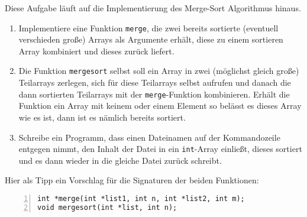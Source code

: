 \documentclass{uebungszettel}
\begin{document}
\begin{aufg}
Diese Aufgabe läuft auf die Implementierung des Merge-Sort Algorithmus hinaus.
\begin{enumerate}
\item Implementiere eine Funktion \verb|merge|, die zwei bereits sortierte (eventuell verschieden große) Arrays als Argumente erhält, diese zu einem sortieren Array kombiniert und dieses zurück liefert. 
\item Die Funktion \verb|mergesort| selbst soll ein Array in zwei (möglichst gleich große) Teilarrays zerlegen, sich für diese Teilarrays selbst aufrufen und danach die dann sortierten Teilarrays mit der \verb|merge|-Funktion kombinieren. Erhält die Funktion ein Array mit keinem oder einem Element so belässt es dieses Array wie es ist, dann ist es nämlich bereits sortiert.
\item Schreibe ein Programm, dass einen Dateinamen auf der Kommandozeile entgegen nimmt, den Inhalt der Datei in ein \verb|int|-Array einließt, dieses sortiert und es dann wieder in die gleiche Datei zurück schreibt.
\end{enumerate}

Hier als Tipp ein Vorschlag für die Signaturen der beiden Funktionen:
\begin{codelisting}
\begin{lstlisting}[numbers=left,numberstyle=\tiny,frame=tlrb]
int *merge(int *list1, int n, int *list2, int m);
void mergesort(int *list, int n);
\end{lstlisting}
\end{codelisting}
\end{aufg}
\end{document}
